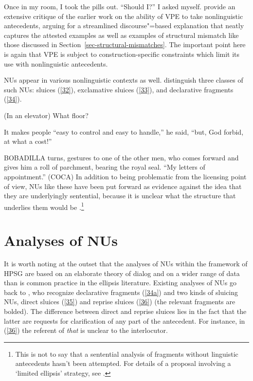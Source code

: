 \documentclass[output=paper
                ,modfonts
                ,nonflat
	        ,collection
	        ,collectionchapter
	        ,collectiontoclongg
 	        ,biblatex
                ,babelshorthands
                ,newtxmath
                ,draftmode
                ,colorlinks, citecolor=brown
]{./langsci/langscibook}
\begin{document}
{\ea Once in my room, I took the pills out. ``Should I?'' I asked myself. \citep[ex. 22a][]{Miller2014b}\label{31}\z
\citet{Miller2014b} provide an extensive critique of the earlier work on the ability of VPE to take nonlinguistic antecedents, arguing for a streamlined discourse"=based explanation that neatly captures the attested examples as well as examples of structural mismatch like those discussed in Section~\ref{sec-structural-mismatches}. The important point here is again that VPE is subject to construction-specific constraints which limit its use with nonlinguistic antecedents.

NUs appear in various nonlinguistic contexts as well. \citet{Ginzburg2018} distinguish three classes of such NUs: sluices (\ref{32}), exclamative sluices (\ref{33}), and declarative fragments (\ref{34}).

\ea (In an elevator) What floor? \citep[298]{Ginzburg:Sag:2000}\label{32}\z

\ea It makes people ``easy to control and easy to handle,'' he said, ``but, God forbid, at what a cost!''
\label{33}\z

\ea BOBADILLA turns, gestures to one of the other men, who comes forward and gives him a roll of parchment, bearing the royal seal. ``My letters of appointment.'' (COCA)\label{34}\z
In addition to being problematic from the licensing point of view, NUs like these have been put forward as evidence against the idea that they are underlyingly sentential, because it is unclear what the structure that underlies them would be \citep[see][]{Ginzburg:Sag:2000, CJ2005a, Stainton2006}.\footnote{This is not to say that a sentential analysis of fragments without linguistic antecedents hasn't been attempted. For details of a proposal involving a `limited ellipsis' strategy, see \citet{Merchant2005a}.}


\section{Analyses of NUs}
\label{sec-analyses-of-NUs}

It is worth noting at the outset that the analyses of NUs within the framework of HPSG are based on an elaborate theory of dialog \citep{Ginzburg1994, Ginzburg2004, Ginzburg2014a, Larsson2002, Prver2006, Fernandez2006, Fernandez2002, Fernandez2007, Ginzburg2010, Ginzburg2014b, Ginzburg2012, Ginzburg2013} and on a wider range of data than is common practice in the ellipsis literature. Existing analyses of NUs go back to \citet{Ginzburg:Sag:2000}, who recognize declarative fragments (\ref{34a}) and two kinds of sluicing NUs, direct sluices (\ref{35}) and reprise sluices (\ref{36}) (the relevant fragments are bolded). The difference between direct and reprise sluices lies in the fact that the latter are requests for clarification of any part of the antecedent. For instance, in (\ref{36}) the referent of \emph{that} is unclear to the interlocutor.

}
\end{document}
